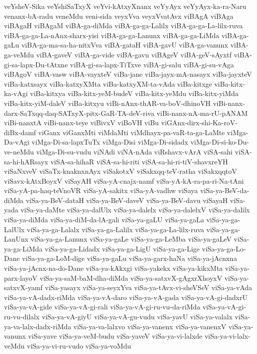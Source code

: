 {veYsheV-Sika
veYshiSaTxyX
veYvi-kAtxyXnanx
veYyAyx
veYyAyx-ka-ra-Naru
venanx-bA-radu
veneMdu
veni-sida
veyxVva
veyxVvatAvx
viBAgA
viBAga
viBAgaH
viBAgaM
viBA-ga-diMda
viBA-ga-ga-Lalilx
viBA-ga-ga-La-lilx-ruva
viBA-ga-ga-La-nAnx-sharx-yisi
viBA-ga-ga-Lanunx
viBA-ga-ga-LiMda
viBA-ga-gaLu
viBA-ga-ma-sa-ha-nitxVva
viBA-gataH
viBA-gavU
viBA-ga-vanunx
viBA-ga-veMdu
viBA-gaveV
viBA-ga-vide
viBA-gavu
viBAgeV
viBA-geV-sAyxtf
viBA-gi-sa-lapx-Du-tAtxne
viBA-gi-sa-lapx-TiTxve
viBA-gi-salu
viBA-gi-su-vAga
viBAgoV
viBA-vasw
viBA-vayxteV
viBa-jane
viBa-jayx-mA-nasayx
viBa-jayxteV
viBa-katxsayx
viBa-katxyXMta
viBa-katxyXM-ta-vAda
viBa-kitxge
viBa-kitx-ka-vAgi
viBa-kitxya
viBa-kitx-yeM-budeV
viBa-kitx-yeMdu
viBa-kitx-yiMda
viBa-kitx-yiM-daleV
viBa-kitxyu
viBi-nAnx-thAR-va-boV-dhinoVH
viBi-nanx-darx-SaTxqq-daq-SATxyX-pitx-GaR-TA-deV-riva
viBi-nanx-nA-ma-rU-pANAM
viBi-nanxtA
viBi-nanx-teye
viBivxV
viBoVH
viBu
viGAnx-dirx-shi-Ka-roV-diBx-damf
viGanx
viGanxMti
viMdaMti
viMdhayx-pa-vaR-ta-ga-LaMte
viMga-Da-vAgi
viMga-Di-sa-lapxTuTx
viMga-Disi
viMga-Di-sidadx
viMga-Di-si-ko-Du-ve-neMdu
viMga-Di-su-vudu
viNAdi
viNA-nAda
viRshavx-vArA
viSA-sahi
viSA-sa-hi-hARsayx
viSA-sa-hihaR
viSA-sa-hi-riti
viSA-sa-hi-ri-tiV-shavxreYH
viSaNxveV
viSaTx-knaknxnAyx
viSakotxV
viSakxqq-teV-ratha
viSakxqqtoV
viSavx-kAtxBoyxV
viSayAH
viSa-yA-cnajx-namf
viSa-yA-kA-ra-pa-ri-Na-tAni
viSa-yA-pa-haq-teVnoVR
viSa-yA-sakitx
viSa-yA-vadhw
viSaya
viSa-ya-BeV-da-diMda
viSa-ya-BeV-dataH
viSa-ya-BeV-daveV
viSa-ya-BeV-davu
viSayaH
viSa-yada
viSa-ya-daMte
viSa-ya-dalUlx
viSa-ya-dalelx
viSa-ya-dalelxV
viSa-ya-dalilx
viSa-ya-diMda
viSa-ya-diM-da-lA-gali
viSa-ya-gaLU
viSa-ya-gaLa
viSa-ya-ga-LalUlx
viSa-ya-ga-Lalalx
viSa-ya-ga-Lalilx
viSa-ya-ga-La-lilx-ruva
viSa-ya-ga-LanUnx
viSa-ya-ga-Lanunx
viSa-ya-gaLe
viSa-ya-ga-LeMba
viSa-ya-gaLeV
viSa-ya-ga-LiMda
viSa-ya-ga-Lidadx
viSa-ya-ga-LigU
viSa-ya-ga-Lige
viSa-ya-ga-Lo-Dane
viSa-ya-ga-LoM-dige
viSa-ya-gaLu
viSa-ya-garx-haNa
viSa-ya-jAcnxna
viSa-ya-jAcnx-na-do-Dane
viSa-ya-kAkxgi
viSa-yakekx
viSa-ya-kikxMta
viSa-ya-parx-layoV
viSa-ya-saM-baM-dha-diMda
viSa-ya-satxvX-gAgxrXhoyxV
viSa-ya-satxvX-yamf
viSa-yasayx
viSa-ya-seyxYva
viSa-ya-tAvx-vi-sheVSeV
viSa-ya-vAda
viSa-ya-vA-dadx-riMda
viSa-ya-vA-daro
viSa-ya-vA-gada
viSa-ya-vA-gi-dadxrU
viSa-ya-vA-gide
viSa-ya-vA-gi-rali
viSa-ya-vA-gi-ru-vu-da-riMda
viSa-ya-vA-gi-ru-vu-dilalx
viSa-ya-vA-giyU
viSa-ya-vA-gu-vudu
viSa-yavU
viSa-ya-valalx
viSa-ya-va-lalx-dadx-riMda
viSa-ya-va-lalxvo
viSa-ya-vanenx
viSa-ya-vanenxV
viSa-ya-vanunx
viSa-yave
viSa-ya-veM-budu
viSa-yaveV
viSa-ya-vi-lalxde
viSa-ya-vi-lalx-veMdu
viSa-ya-vi-ru-vudo
viSa-ya-voMdu
}
